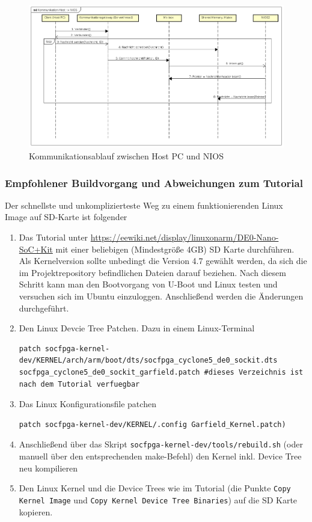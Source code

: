 \begin{figure}
	\includegraphics[width=\textwidth]{Abb/Komm_Host_NIOS.png}
	\caption{Kommunikationsablauf zwischen Host PC und NIOS}
	\label{SW:Komm:HOSTNIOS}
\end{figure}

\subsubsection{Empfohlener Buildvorgang und Abweichungen zum Tutorial}
Der schnellste und unkomplizierteste Weg zu einem funktionierenden Linux Image auf SD-Karte ist folgender
\begin{enumerate}
	\item Das Tutorial unter \href{https://eewiki.net/display/linuxonarm/DE0-Nano-SoC+Kit}{https://eewiki.net/display/linuxonarm/DE0-Nano-SoC+Kit} mit einer beliebigen (Mindestgröße 4GB) SD Karte durchführen. Als Kernelversion sollte unbedingt die Version 4.7 gewählt werden, da sich die im Projektrepository befindlichen Dateien darauf beziehen. Nach diesem Schritt kann man den Bootvorgang von U-Boot und Linux testen und versuchen sich im Ubuntu einzuloggen. Anschließend werden die Änderungen durchgeführt.
	\item Den Linux Devcie Tree Patchen. Dazu in einem Linux-Terminal
\lstset{language=bash}
	\begin{lstlisting}[breaklines=true]
patch socfpga-kernel-dev/KERNEL/arch/arm/boot/dts/socfpga_cyclone5_de0_sockit.dts socfpga_cyclone5_de0_sockit_garfield.patch #dieses Verzeichnis ist nach dem Tutorial verfuegbar
	\end{lstlisting}
	\item Das Linux Konfigurationsfile patchen
	\begin{lstlisting}[breaklines=true]
patch socfpga-kernel-dev/KERNEL/.config Garfield_Kernel.patch)
	\end{lstlisting}
	\item Anschließend über das Skript \texttt{socfpga-kernel-dev/tools/rebuild.sh} (oder manuell über den entsprechenden make-Befehl) den Kernel inkl. Device Tree neu kompilieren
	\item Den Linux Kernel und die Device Trees wie im Tutorial (die Punkte \texttt{Copy Kernel Image} und \texttt{Copy Kernel Device Tree Binaries}) auf die SD Karte kopieren.
\end{enumerate}

